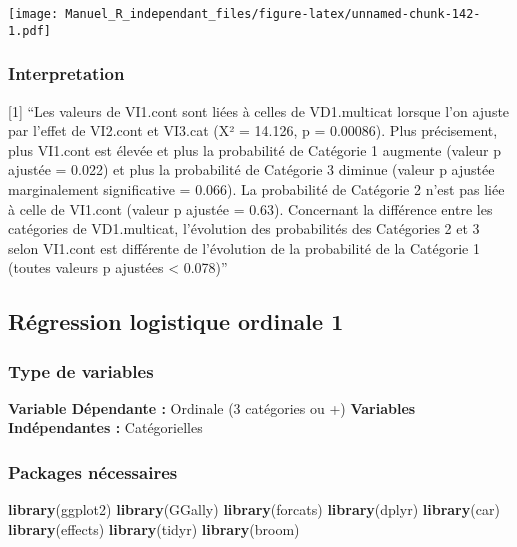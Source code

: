 \documentclass[
]{book}
\newenvironment{Shaded}{\begin{snugshade}}{\end{snugshade}}
\newcommand{\KeywordTok}[1]{\textcolor[rgb]{0.13,0.29,0.53}{\textbf{#1}}}
\newcommand{\NormalTok}[1]{#1}
\begin{document}
\texttt{[image: Manuel\_R\_independant\_files/figure-latex/unnamed-chunk-142-1.pdf]}

\hypertarget{interpretation-16}{%
\subsubsection{Interpretation}\label{interpretation-16}}

{[}1{]} ``Les valeurs de VI1.cont sont liées à celles de VD1.multicat lorsque l'on ajuste par l'effet de VI2.cont et VI3.cat (X² = 14.126, p = 0.00086). Plus précisement, plus VI1.cont est élevée et plus la probabilité de Catégorie 1 augmente (valeur p ajustée = 0.022) et plus la probabilité de Catégorie 3 diminue (valeur p ajustée marginalement significative = 0.066). La probabilité de Catégorie 2 n'est pas liée à celle de VI1.cont (valeur p ajustée = 0.63). Concernant la différence entre les catégories de VD1.multicat, l'évolution des probabilités des Catégories 2 et 3 selon VI1.cont est différente de l'évolution de la probabilité de la Catégorie 1 (toutes valeurs p ajustées \textless{} 0.078)''

\hypertarget{ruxe9gression-logistique-ordinale-1}{%
\subsection{Régression logistique ordinale 1}\label{ruxe9gression-logistique-ordinale-1}}

\hypertarget{type-de-variables-17}{%
\subsubsection{Type de variables}\label{type-de-variables-17}}

\textbf{Variable Dépendante :} Ordinale (3 catégories ou +)
\textbf{Variables Indépendantes :} Catégorielles

\hypertarget{packages-nuxe9cessaires-17}{%
\subsubsection{Packages nécessaires}\label{packages-nuxe9cessaires-17}}

\begin{Shaded}
\begin{Highlighting}[]
\KeywordTok{library}\NormalTok{(ggplot2)}
\KeywordTok{library}\NormalTok{(GGally)}
\KeywordTok{library}\NormalTok{(forcats)}
\KeywordTok{library}\NormalTok{(dplyr)}
\KeywordTok{library}\NormalTok{(car)}
\KeywordTok{library}\NormalTok{(effects)}
\KeywordTok{library}\NormalTok{(tidyr)}
\KeywordTok{library}\NormalTok{(broom)}
\end{Highlighting}
\end{Shaded}
\end{document}
